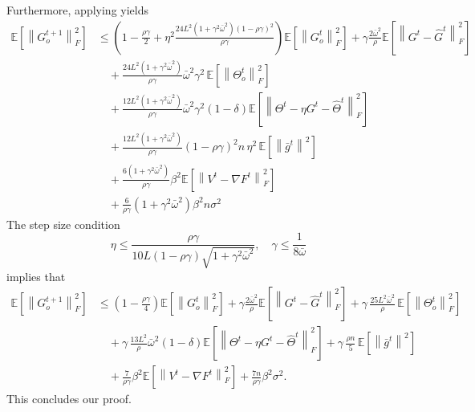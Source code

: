 \documentclass[10pt]{article} %
\theoremstyle{plain}
\theoremstyle{definition}
\theoremstyle{remark}
\newcommand{\grdF}{\nabla F}
\newcommand{\bw}{\bar{\omega}}
\newcommand{\avgg}{\bar{g}}
\newcommand{\norm}[1]{\left\| #1 \right\|}
\newcommand{\nl}{\nonumber\\}
\begin{document}
Furthermore, applying  yields
\begin{align*}
\mathbb{E} \left[ \norm{G_o^{t+1}}_F^2 \right] & \leq \left( 1 - \frac{ \rho \gamma }{2} + \eta^2 \frac{ 24 L^2 (1 + \gamma^2 \bw^2) ( 1 - \rho \gamma)^2 }{ \rho \gamma } \right) \mathbb{E} \left[ \norm{ G_o^t }_F^2 \right] + \gamma \frac{ 2 \bw^2}{ \rho } \mathbb{E} \left[ \norm{ G^t - \hat{G}^t }_F^2 \right] \nl 
& \quad + \frac{24 L^2 (1 + \gamma^2 \bw^2)}{\rho \gamma} \bw^2 \gamma^2 \, \mathbb{E} \left[ \norm{ \Theta_o^t}_F^2 \right] \nl 
& \quad + \frac{12 L^2(1 + \gamma^2 \bw^2)}{ \rho \gamma } \bw^2 \gamma^2 (1 - \delta) \mathbb{E} \left[ \norm{ \Theta^t - \eta G^t - \hat{\Theta}^t }_F^2 \right] \nl 
& \quad + \frac{12 L^2 (1 + \gamma^2 \bw^2)}{\rho \gamma} (1 - \rho \gamma)^2 n \, \eta^2 \, \mathbb{E} \left[ \norm{ \avgg^t }^2 \right] \nl 
& \quad + \frac{6 (1 + \gamma^2 \bw^2 )}{ \rho \gamma } \beta^2 \mathbb{E} \left[ \norm{V^t - \grdF^t}_F^2 \right] \nl
& \quad + \frac{6}{\rho \gamma} \left( 1 + \gamma^2 \bw^2 \right) \beta^2 n \sigma^2 
\end{align*}
The step size condition 
\begin{equation} \label{eq:eta_gcond}
\eta \leq \frac{ \rho \gamma }{ 10 L (1-\rho\gamma) \sqrt{1 + \gamma^2 \bw^2} }, \quad \gamma \leq \frac{1}{8 \bw}
\end{equation}
implies that 
\begin{align*}
\mathbb{E} \left[ \norm{G_o^{t+1}}_F^2 \right] & \leq \left( 1 - \frac{ \rho \gamma }{4} \right) \mathbb{E} \left[ \norm{ G_o^t }_F^2 \right] + \gamma \frac{ 2 \bw^2}{ \rho } \mathbb{E} \left[ \norm{ G^t - \hat{G}^t }_F^2 \right] + \gamma \, \frac{25 L^2 \bw^2}{\rho} \, \mathbb{E} \left[ \norm{ \Theta_o^t}_F^2 \right] \nl 
& \quad + \gamma \, \frac{13 L^2}{ \rho } \bw^2 (1 - \delta) \mathbb{E} \left[ \norm{ \Theta^t - \eta G^t - \hat{\Theta}^t }_F^2 \right] + \gamma \, \frac{ \rho n}{5} \, \mathbb{E} \left[ \norm{ \avgg^t }^2 \right] \\
& \quad + \frac{7}{ \rho \gamma } \beta^2 \mathbb{E} \left[ \norm{V^t - \grdF^t}_F^2 \right] + \frac{7n }{\rho \gamma} \beta^2 \sigma^2 .
\end{align*}
This concludes our proof.
\end{document}

